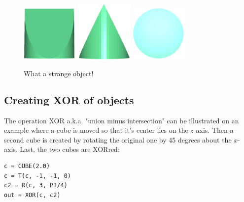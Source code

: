 \begin{figure}[!ht]
\begin{center}
\includegraphics[width=0.25\textwidth]{img/int-1a.png}
\includegraphics[width=0.25\textwidth]{img/int-1b.png}
\includegraphics[width=0.25\textwidth]{img/int-1c.png}
\end{center}
\vspace{-4mm}
\caption{What a strange object!}
\label{fig:int-1}
\end{figure}


\subsection{Creating XOR of objects}\label{subsec:xor}

The operation XOR a.k.a. "union minus intersection" can be illustrated  
on an example where a cube is moved so that it's center lies on the $z$-axis. Then 
a second cube is created by rotating the original one by 45 degrees about the 
$x$-axis. Last, the two cubes are XORred:\\
 
\begin{bbox}
\begin{verbatim}
c = CUBE(2.0)
c = T(c, -1, -1, 0)
c2 = R(c, 3, PI/4)
out = XOR(c, c2) 
\end{verbatim}
\end{bbox}
\vspace{6mm}

